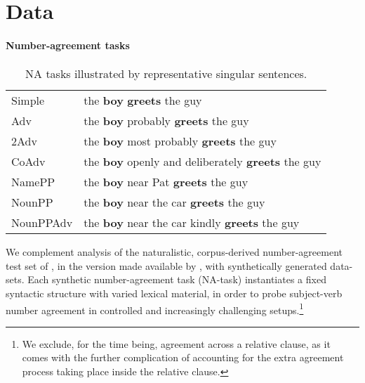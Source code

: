 \section{Data}\label{sec:the_data}

\paragraph{Number-agreement tasks}
\begin{table}[tb]
  \centering
  \begin{footnotesize}
  \begin{tabular}{l@{\hskip1pt}l}
    \B Simple & the \textbf{boy} \textbf{greets} the guy\\
    \B Adv & the \textbf{boy} probably \textbf{greets} the guy\\
    \B 2Adv & the \textbf{boy} most probably \textbf{greets} the guy\\
    \B CoAdv &  the \textbf{boy} openly and deliberately \textbf{greets} the guy\\
    \B NamePP & the \textbf{boy} near Pat \textbf{greets} the guy\\
    \B NounPP & the \textbf{boy} near the car \textbf{greets} the guy\\
    \B NounPPAdv & the \textbf{boy} near the car kindly \textbf{greets} the guy\\
  \end{tabular}
  \end{footnotesize}
  \caption{NA tasks illustrated by representative
    singular sentences.}
  \label{tab:data-sets}
\end{table}

We complement analysis of the naturalistic, corpus-derived
number-agreement test set of , in the
version made available by , with
synthetically generated data-sets. Each synthetic number-agreement
task (NA-task) instantiates a fixed syntactic structure with varied
lexical material, in order to probe subject-verb number agreement in
controlled and increasingly challenging setups.\footnote{We exclude,
  for the time being, agreement across a relative clause, as it comes
  with the further complication of accounting for the extra agreement
  process taking place inside the relative clause.}

